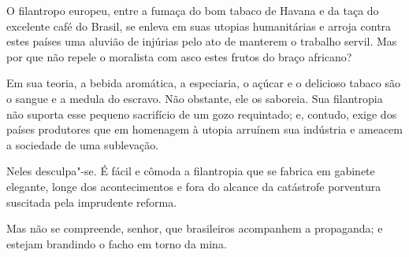 \begin{linenumbers}
 O filantropo europeu, entre a fumaça do bom tabaco de Havana e da taça
do excelente café do Brasil, se enleva em suas utopias humanitárias e
arroja contra estes países uma aluvião de injúrias pelo ato de manterem
o trabalho servil. Mas por que não repele o moralista com asco estes
frutos do braço africano?

Em sua teoria, a bebida aromática, a especiaria, o açúcar e o delicioso
tabaco são o sangue e a medula do escravo. Não obstante, ele os
saboreia. Sua filantropia não suporta esse pequeno sacrifício de um
gozo requintado; e, contudo, exige dos países produtores que em
homenagem à utopia arruínem sua indústria e ameacem a sociedade de uma sublevação.

Neles desculpa"-se. É fácil e cômoda a filantropia que se fabrica em
gabinete elegante, longe dos acontecimentos e fora do alcance da
catástrofe porventura suscitada pela imprudente reforma.

Mas não se compreende, senhor, que brasileiros acompanhem a propaganda;
e estejam brandindo o facho em torno da mina.

\end{linenumbers}

\sectionitem

